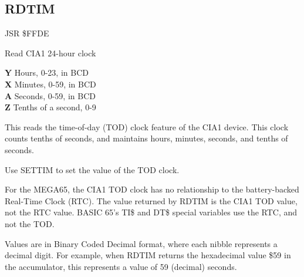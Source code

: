 
\newpage
\subsection{RDTIM}
\label{KERNAL Jump Table!RDTIM}
\begin{description}[leftmargin=2cm,style=nextline]
    \item [Address:] JSR \$FFDE
    \item [Description:] Read CIA1 24-hour clock
    \item [Outputs:]
        \textbf{Y} Hours, 0-23, in BCD \\
        \textbf{X} Minutes, 0-59, in BCD \\
        \textbf{A} Seconds, 0-59, in BCD \\
        \textbf{Z} Tenths of a second, 0-9
    \item [Remarks:]
        This reads the time-of-day (TOD) clock feature of the CIA1 device. This clock counts tenths of seconds, and maintains hours, minutes, seconds, and tenths of seconds.

        Use SETTIM to set the value of the TOD clock.

        For the MEGA65, the CIA1 TOD clock has no relationship to the battery-backed Real-Time Clock (RTC). The value returned by RDTIM is the CIA1 TOD value, not the RTC value. BASIC 65's TI\$ and DT\$ special variables use the RTC, and not the TOD.

        Values are in Binary Coded Decimal format, where each nibble represents a decimal digit. For example, when RDTIM returns the hexadecimal value \$59 in the accumulator, this represents a value of 59 (decimal) seconds.
    \item [Example:]
\end{description}



\newpage
